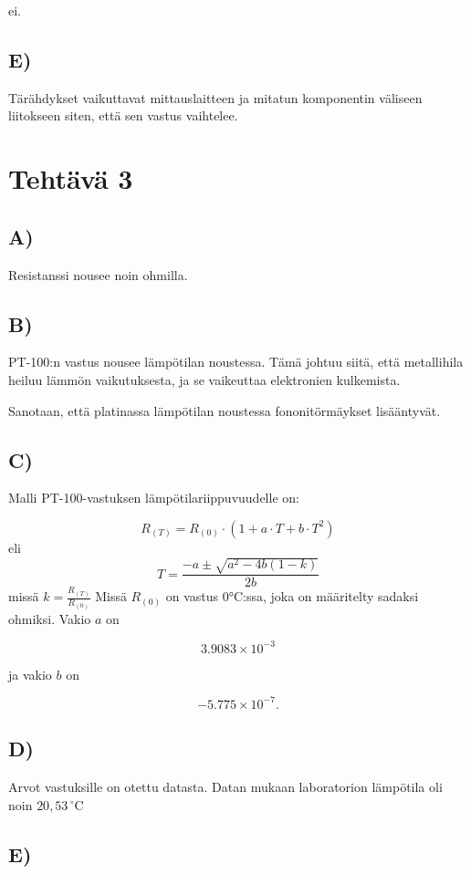 \documentclass{article}
\begin{document}
ei.

\subsection*{E)}
Tärähdykset vaikuttavat mittauslaitteen ja mitatun komponentin väliseen liitokseen siten, 
että sen vastus vaihtelee.

\section*{Tehtävä 3}

\subsection*{A)}
Resistanssi nousee noin ohmilla.

\subsection*{B)}
PT-100:n vastus nousee lämpötilan noustessa. Tämä johtuu siitä, että metallihila heiluu lämmön vaikutuksesta, 
ja se vaikeuttaa elektronien kulkemista. \cite{therma_temperature_resistance}

Sanotaan, että platinassa lämpötilan noustessa fononitörmäykset lisääntyvät. 
\cite{wikipedia_phonon_scattering}

\subsection*{C)}
Malli PT-100-vastuksen lämpötilariippuvuudelle on:

\[
R_{(T)} = R_{(0)} \cdot \left( 1 + a \cdot T + b \cdot T^2 \right)
\]
eli
\[
T = \frac{-a \pm \sqrt{a^2 - 4b(1 - k)}}{2b}
\]
missä $k = \frac{R_{(T)}}{R_{(0)}}$
Missä $R_{(0)}$ on vastus 0°C:ssa, joka on määritelty sadaksi ohmiksi.
Vakio $a$ on 

\[
3.9083 \times 10^{-3}
\]

ja vakio $b$ on 

\[
-5.775 \times 10^{-7}.
\]


\subsection*{D)}

Arvot vastuksille on otettu datasta. Datan mukaan laboratorion lämpötila oli noin $20,53\,^\circ \text{C}$

\subsection*{E)}
\end{document}
